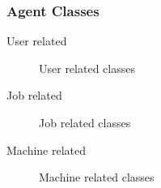 \subsubsection{Agent Classes}
\begin{asparaenum}
\item User related
\begin{figure}[htbp]
    \centering
    \scriptsize
    \begin{tikzpicture}
    
    

    \end{tikzpicture}
    \caption{User related classes}
    \label{fig:userclassed}
\end{figure}
\item Job related
\begin{figure}[htbp]
    \centering
    \scriptsize
    \begin{tikzpicture}
    
    
    
    \end{tikzpicture}
    \caption{Job related classes}
    \label{fig:jobclassed}
\end{figure}
\item Machine related
\end{asparaenum}
\begin{figure}[htbp]
    \centering
    \scriptsize
    \begin{tikzpicture}
    
    
    
    \end{tikzpicture}
    \caption{Machine related classes}
    \label{fig:machineclassed}
\end{figure}
